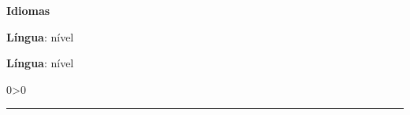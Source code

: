 \documentclass[a4paper,10pt]{article}
\newcommand{\criaSecao}[4][0]{
    \noindent
	\begin{minipage}{0.16\linewidth}
		\large{\textbf{#2}}
		\vspace{#3\baselineskip}
	\end{minipage}
	\hfill
	\begin{minipage}{0.79\linewidth}
		#4
		\ifnum0#1>0 { \hrule {\ } } \fi
	\end{minipage}
	\vspace{\baselineskip}
}
\begin{document}
	\criaSecao{Idiomas}{2}{
	    \large{
			\begin{minipage}{0.5\linewidth}
				\textbf{Língua}: nível \\
			\end{minipage}
			\begin{minipage}{0.5\linewidth}
				\textbf{Língua}: nível \\
			\end{minipage}
		}
	}
    \label{ultimaPagina}
\end{document}
